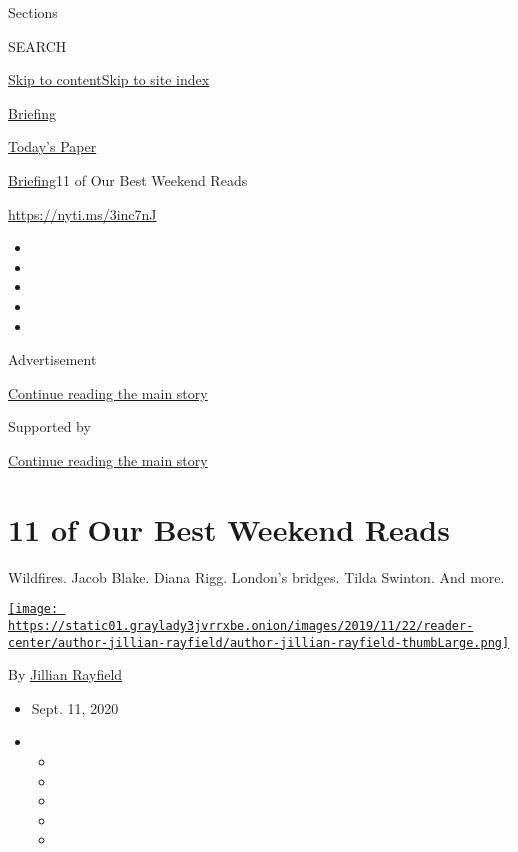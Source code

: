 Sections

SEARCH

\protect\hyperlink{site-content}{Skip to
content}\protect\hyperlink{site-index}{Skip to site index}

\href{https://www.nytimes3xbfgragh.onion/interactive/2018/briefing/global-morning-briefing-newsletter-signup.html}{Briefing}

\href{https://myaccount.nytimes3xbfgragh.onion/auth/login?response_type=cookie\&client_id=vi}{}

\href{https://www.nytimes3xbfgragh.onion/section/todayspaper}{Today's
Paper}

\href{/interactive/2018/briefing/global-morning-briefing-newsletter-signup.html}{Briefing}\textbar{}11
of Our Best Weekend Reads

\url{https://nyti.ms/3inc7nJ}

\begin{itemize}
\item
\item
\item
\item
\item
\end{itemize}

Advertisement

\protect\hyperlink{after-top}{Continue reading the main story}

Supported by

\protect\hyperlink{after-sponsor}{Continue reading the main story}

\hypertarget{11-of-our-best-weekend-reads}{%
\section{11 of Our Best Weekend
Reads}\label{11-of-our-best-weekend-reads}}

Wildfires. Jacob Blake. Diana Rigg. London's bridges. Tilda Swinton. And
more.

\href{https://www.nytimes3xbfgragh.onion/by/jillian-rayfield}{\texttt{[image: https://static01.graylady3jvrrxbe.onion/images/2019/11/22/reader-center/author-jillian-rayfield/author-jillian-rayfield-thumbLarge.png]}}

By \href{https://www.nytimes3xbfgragh.onion/by/jillian-rayfield}{Jillian
Rayfield}

\begin{itemize}
\item
  Sept. 11, 2020
\item
  \begin{itemize}
  \item
  \item
  \item
  \item
  \item
  \end{itemize}
\end{itemize}

